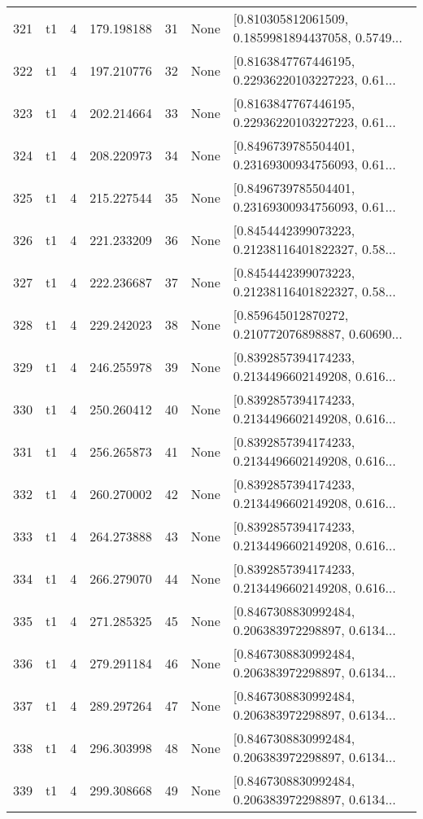 \begin{tabular}{lllrlll}
321 &  t1 &   4 &  179.198188 &   31 &  None &  [0.810305812061509, 0.1859981894437058, 0.5749... \\
322 &  t1 &   4 &  197.210776 &   32 &  None &  [0.8163847767446195, 0.22936220103227223, 0.61... \\
323 &  t1 &   4 &  202.214664 &   33 &  None &  [0.8163847767446195, 0.22936220103227223, 0.61... \\
324 &  t1 &   4 &  208.220973 &   34 &  None &  [0.8496739785504401, 0.23169300934756093, 0.61... \\
325 &  t1 &   4 &  215.227544 &   35 &  None &  [0.8496739785504401, 0.23169300934756093, 0.61... \\
326 &  t1 &   4 &  221.233209 &   36 &  None &  [0.8454442399073223, 0.21238116401822327, 0.58... \\
327 &  t1 &   4 &  222.236687 &   37 &  None &  [0.8454442399073223, 0.21238116401822327, 0.58... \\
328 &  t1 &   4 &  229.242023 &   38 &  None &  [0.859645012870272, 0.210772076898887, 0.60690... \\
329 &  t1 &   4 &  246.255978 &   39 &  None &  [0.8392857394174233, 0.2134496602149208, 0.616... \\
330 &  t1 &   4 &  250.260412 &   40 &  None &  [0.8392857394174233, 0.2134496602149208, 0.616... \\
331 &  t1 &   4 &  256.265873 &   41 &  None &  [0.8392857394174233, 0.2134496602149208, 0.616... \\
332 &  t1 &   4 &  260.270002 &   42 &  None &  [0.8392857394174233, 0.2134496602149208, 0.616... \\
333 &  t1 &   4 &  264.273888 &   43 &  None &  [0.8392857394174233, 0.2134496602149208, 0.616... \\
334 &  t1 &   4 &  266.279070 &   44 &  None &  [0.8392857394174233, 0.2134496602149208, 0.616... \\
335 &  t1 &   4 &  271.285325 &   45 &  None &  [0.8467308830992484, 0.206383972298897, 0.6134... \\
336 &  t1 &   4 &  279.291184 &   46 &  None &  [0.8467308830992484, 0.206383972298897, 0.6134... \\
337 &  t1 &   4 &  289.297264 &   47 &  None &  [0.8467308830992484, 0.206383972298897, 0.6134... \\
338 &  t1 &   4 &  296.303998 &   48 &  None &  [0.8467308830992484, 0.206383972298897, 0.6134... \\
339 &  t1 &   4 &  299.308668 &   49 &  None &  [0.8467308830992484, 0.206383972298897, 0.6134... \\

\end{tabular}
